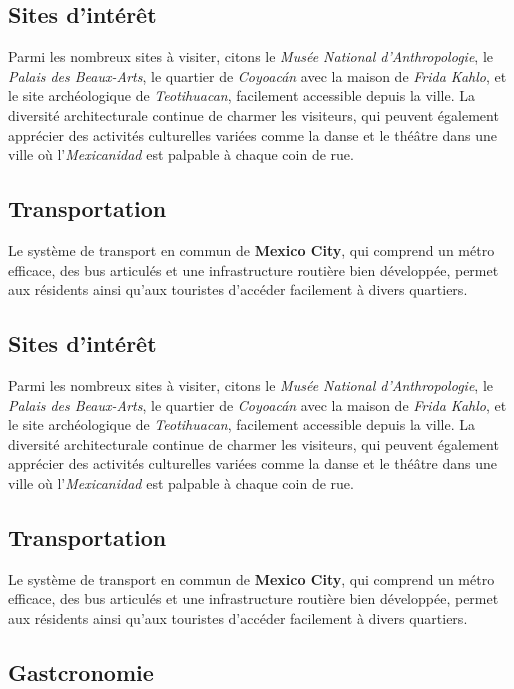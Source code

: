 \documentclass[12pt, a4paper]{article}
\begin{document}
\subsection*{\textbf{Sites d'intérêt}}

Parmi les nombreux sites à visiter, citons le \textit{Musée National d'Anthropologie}, le \textit{Palais des Beaux-Arts}, le quartier de \textit{Coyoacán} avec la maison de \textit{Frida Kahlo}, et le site archéologique de \textit{Teotihuacan}, facilement accessible depuis la ville.
La diversité architecturale continue de charmer les visiteurs, qui peuvent également apprécier des activités culturelles variées comme la danse et le théâtre dans une ville où l'\textit{Mexicanidad} est palpable à chaque coin de rue. \subsection*{\textbf{Transportation}} Le système de transport en commun de \textbf{Mexico City}, qui comprend un métro efficace, des bus articulés et une infrastructure routière bien développée, permet aux résidents ainsi qu'aux touristes d'accéder facilement à divers quartiers.

\subsection*{\textbf{Sites d'intérêt}}

Parmi les nombreux sites à visiter, citons le \textit{Musée National d'Anthropologie}, le \textit{Palais des Beaux-Arts}, le quartier de \textit{Coyoacán} avec la maison de \textit{Frida Kahlo}, et le site archéologique de \textit{Teotihuacan}, facilement accessible depuis la ville.
La diversité architecturale continue de charmer les visiteurs, qui peuvent également apprécier des activités culturelles variées comme la danse et le théâtre dans une ville où l'\textit{Mexicanidad} est palpable à chaque coin de rue. \subsection*{\textbf{Transportation}} Le système de transport en commun de \textbf{Mexico City}, qui comprend un métro efficace, des bus articulés et une infrastructure routière bien développée, permet aux résidents ainsi qu'aux touristes d'accéder facilement à divers quartiers.

\subsection*{\textbf{Gastcronomie}}
\end{document}
